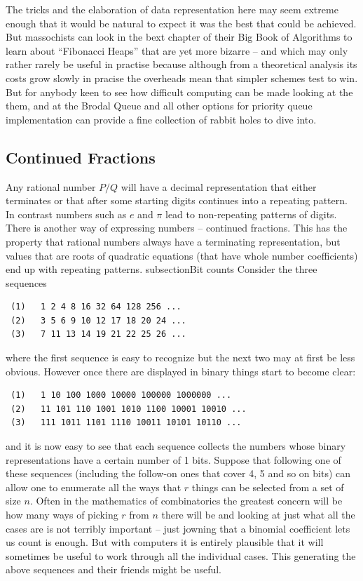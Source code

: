 The tricks and the elaboration of data representation here may seem
extreme enough that it would be natural to expect it was the best that
could be achieved. But massochists can look in the bext chapter
of their Big Book of Algorithms to learn about ``Fibonacci Heaps'' that
are yet more bizarre -- and which may only rather rarely be useful
in practise because although from a theoretical analysis its costs
grow slowly in pracise the overheads mean that simpler schemes test
to win. But for anybody keen to see how difficult computing
can be made looking at the them, and at the Brodal Queue and all
other options for priority queue implementation can provide a fine
collection of rabbit holes to dive into.
\subsection{Continued Fractions}
Any rational number $P/Q$ will have a decimal representation that
either terminates or that after some starting digits continues into
a repeating pattern. In contrast numbers such as $e$ and $\pi$ lead
to non-repeating patterns of digits. There is another way of expressing
numbers -- continued fractions. This has the property that rational
numbers always have a terminating representation, but values that are
roots of quadratic equations (that have whole number coefficients) end
up with repeating patterns.
subsection{Bit counts}
Consider the three sequences
\begin{verbatim}
 (1)   1 2 4 8 16 32 64 128 256 ...
 (2)   3 5 6 9 10 12 17 18 20 24 ...
 (3)   7 11 13 14 19 21 22 25 26 ...
\end{verbatim}
where the first sequence is easy to recognize but the next two may
at first be less obvious. However once there are displayed in binary
things start to become clear:
\begin{verbatim}
 (1)   1 10 100 1000 10000 100000 1000000 ...
 (2)   11 101 110 1001 1010 1100 10001 10010 ...
 (3)   111 1011 1101 1110 10011 10101 10110 ...
\end{verbatim}
and it is now easy to see that each sequence collects the numbers whose
binary representations have a certain number of 1 bits. Suppose that
following one of these sequences (including the follow-on ones that cover
4, 5 and so on bits) can allow one to enumerate all the ways that $r$
things can be selected from a set of size $n$. Often in the mathematics
of combinatorics the greatest concern will be how many ways of
picking $r$ from $n$ there will be and looking at just what all the
cases are is not terribly important -- just jowning that a binomial
coefficient lets us count is enough. But with computers it is entirely
plausible that it will sometimes be useful to work through all the
individual cases. This generating the above sequences and their friends
might be useful.


